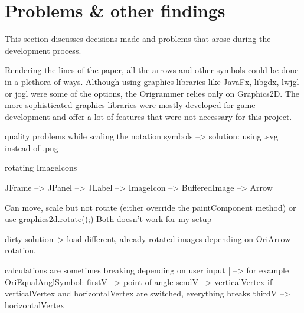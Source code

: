 
\section{Problems \& other findings}
\label{sec:problems}

This section discusses decisions made and problems that arose during the development process.


Rendering the lines of the paper, all the arrows and other symbols could be done in a plethora of ways. Although using graphics libraries like JavaFx, libgdx, lwjgl or jogl were some of the options, the Origrammer relies only on Graphics2D. The more sophisticated graphics libraries were mostly developed for game development and offer a lot of features that were not necessary for this project.


quality problems while scaling the notation symbols --> solution: using .svg instead of .png

rotating ImageIcons

JFrame --> JPanel --> JLabel --> ImageIcon --> BufferedImage --> Arrow

Can move, scale but not rotate (either override the paintComponent method) or use graphics2d.rotate();)
Both doesn't work for my setup

dirty solution--> load different, already rotated images depending on OriArrow rotation.




calculations are sometimes breaking depending on user input
|
--> for example OriEqualAnglSymbol: 	firstV	--> point of angle
						scndV	--> verticalVertex			if verticalVertex and horizontalVertex are switched, everything breaks
						thirdV --> horizontalVertex
						
						
